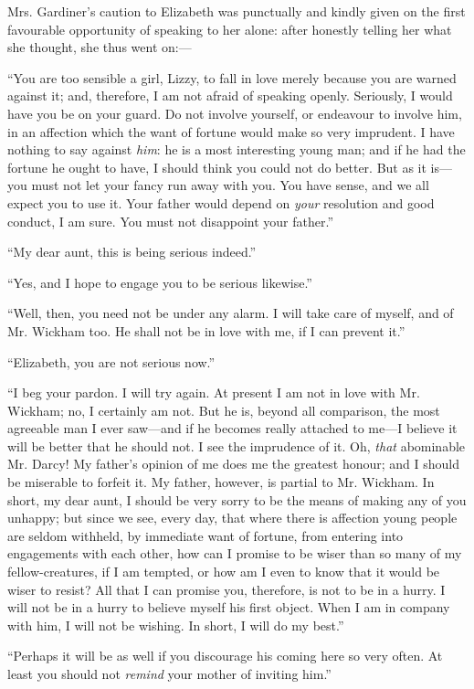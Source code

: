 Mrs. Gardiner's caution to Elizabeth was punctually and kindly given on the first favourable opportunity of speaking to her alone: after honestly telling her what she thought, she thus went on:---

``You are too sensible a girl, Lizzy, to fall in love merely because you are warned against it; and, therefore, I am not afraid of speaking openly. Seriously, I would have you be on your guard. Do not involve yourself, or endeavour to involve him, in an affection which the want of fortune would make so very imprudent. I have nothing to say against \textit{him}: he is a most interesting young man; and if he had the fortune he ought to have, I should think you could not do better. But as it is---you must not let your fancy run away with you. You have sense, and we all expect you to use it. Your father would depend on \textit{your} resolution and good conduct, I am sure. You must not disappoint your father.''

``My dear aunt, this is being serious indeed.''

``Yes, and I hope to engage you to be serious likewise.''

``Well, then, you need not be under any alarm. I will take care of myself, and of Mr. Wickham too. He shall not be in love with me, if I can prevent it.''

``Elizabeth, you are not serious now.''

``I beg your pardon. I will try again. At present I am not in love with Mr. Wickham; no, I certainly am not. But he is, beyond all comparison, the most agreeable man I ever saw---and if he becomes really attached to me---I believe it will be better that he should not. I see the imprudence of it. Oh, \textit{that} abominable Mr. Darcy! My father's opinion of me does me the greatest honour; and I should be miserable to forfeit it. My father, however, is partial to Mr. Wickham. In short, my dear aunt, I should be very sorry to be the means of making any of you unhappy; but since we see, every day, that where there is affection young people are seldom withheld, by immediate want of fortune, from entering into engagements with each other, how can I promise to be wiser than so many of my fellow-creatures, if I am tempted, or how am I even to know that it would be wiser to resist? All that I can promise you, therefore, is not to be in a hurry. I will not be in a hurry to believe myself his first object. When I am in company with him, I will not be wishing. In short, I will do my best.''

``Perhaps it will be as well if you discourage his coming here so very often. At least you should not \textit{remind} your mother of inviting him.''

